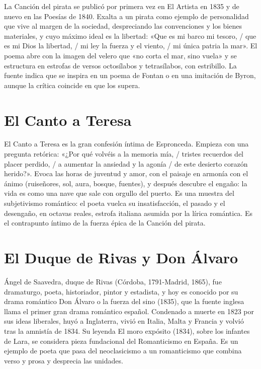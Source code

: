 \documentclass{book}
\begin{document}
La Canción del pirata se publicó por primera vez en El Artista en 1835 y de nuevo en las Poesías de 1840. Exalta a un pirata como ejemplo de personalidad que vive al margen de la sociedad, despreciando las convenciones y los bienes materiales, y cuyo máximo ideal es la libertad: «Que es mi barco mi tesoro, / que es mi Dios la libertad, / mi ley la fuerza y el viento, / mi única patria la mar». El poema abre con la imagen del velero que «no corta el mar, sino vuela» y se estructura en estrofas de versos octosílabos y tetrasílabos, con estribillo. La fuente indica que se inspira en un poema de Fontan o en una imitación de Byron, aunque la crítica coincide en que los supera.


\section{El Canto a Teresa}

El Canto a Teresa es la gran confesión íntima de Espronceda. Empieza con una pregunta retórica: «¿Por qué volvéis a la memoria mía, / tristes recuerdos del placer perdido, / a aumentar la ansiedad y la agonía / de este desierto corazón herido?». Evoca las horas de juventud y amor, con el paisaje en armonía con el ánimo (ruiseñores, sol, aura, bosque, fuentes), y después descubre el engaño: la vida es como una nave que sale con orgullo del puerto. Es una muestra del subjetivismo romántico: el poeta vuelca su insatisfacción, el pasado y el desengaño, en octavas reales, estrofa italiana asumida por la lírica romántica. Es el contrapunto íntimo de la fuerza épica de la Canción del pirata.


\section{El Duque de Rivas y Don Álvaro}

Ángel de Saavedra, duque de Rivas (Córdoba, 1791-Madrid, 1865), fue dramaturgo, poeta, historiador, pintor y estadista, y hoy es conocido por su drama romántico Don Álvaro o la fuerza del sino (1835), que la fuente inglesa llama el primer gran drama romántico español. Condenado a muerte en 1823 por sus ideas liberales, huyó a Inglaterra, vivió en Italia, Malta y Francia y volvió tras la amnistía de 1834. Su leyenda El moro expósito (1834), sobre los infantes de Lara, se considera pieza fundacional del Romanticismo en España. Es un ejemplo de poeta que pasa del neoclasicismo a un romanticismo que combina verso y prosa y desprecia las unidades.
\end{document}
